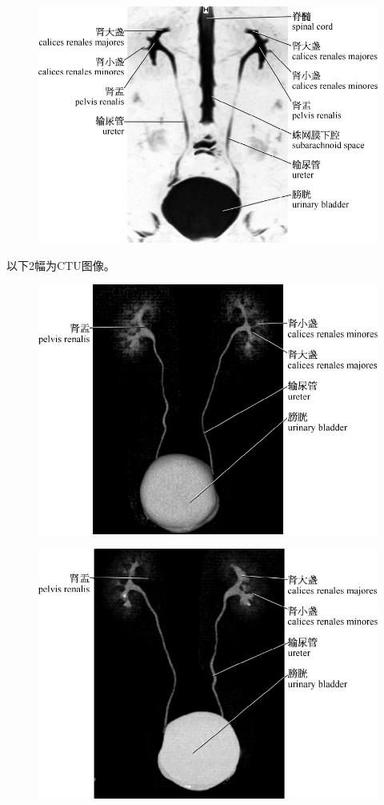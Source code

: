 \begin{figure}[!htbp]
 \centering
 \includegraphics{./images/Image00188.jpg}
  \end{figure} 
 \FloatBarrier



以下2幅为CTU图像。
\begin{figure}[!htbp]
 \centering
 \includegraphics{./images/Image00189.jpg}
  \end{figure} 
 \FloatBarrier

\begin{figure}[!htbp]
 \centering
 \includegraphics{./images/Image00190.jpg}
  \end{figure} 
 \FloatBarrier

